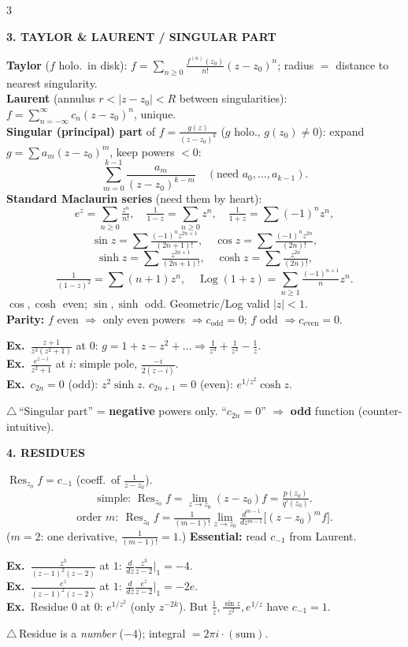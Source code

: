 \documentclass[a4paper,8pt]{extarticle}
\newcommand{\topic}[2]{%
  \vspace{4.5pt}%
  {\colorbox{#1}{\parbox{\dimexpr\columnwidth-2\fboxsep}{\color{white}\bfseries\footnotesize #2}}}\par\vspace{2.5pt}}
\newcommand{\warn}{\textcolor{cWarn}{\textbf{\textwarning\,}}}
\newcommand{\textwarning}{$\triangle$}
\newcommand{\exo}{\textbf{\textcolor{cA}{Ex.}}\ }
\newcommand{\Res}{\operatorname{Res}}
\begin{document}
\begin{multicols}{3}
\topic{cA}{3. TAYLOR \& LAURENT / SINGULAR PART}
\textbf{Taylor} ($f$ holo.\ in disk): $f=\sum_{n\ge0}\frac{f^{(n)}(z_0)}{n!}(z{-}z_0)^n$; radius $=$ distance to nearest singularity.\\
\textbf{Laurent} (annulus $r{<}|z{-}z_0|{<}R$ between singularities): $f=\sum_{n=-\infty}^{\infty}c_n(z{-}z_0)^n$, unique.\\
\textbf{Singular (principal) part} of $f=\frac{g(z)}{(z-z_0)^k}$ ($g$ holo., $g(z_0)\ne0$): expand $g=\sum a_m(z{-}z_0)^m$, keep powers $<0$:
\[ \sum_{m=0}^{k-1}\frac{a_m}{(z-z_0)^{k-m}}\quad(\text{need }a_0,\dots,a_{k-1}).\]
\textbf{Standard Maclaurin series} (need them by heart):
\[ e^z{=}\!\sum_{n\ge0}\tfrac{z^n}{n!},\quad \tfrac1{1-z}{=}\!\sum_{n\ge0}z^n,\quad \tfrac1{1+z}{=}\!\sum(-1)^nz^n,\]
\[ \sin z{=}\!\sum\tfrac{(-1)^nz^{2n+1}}{(2n+1)!},\quad \cos z{=}\!\sum\tfrac{(-1)^nz^{2n}}{(2n)!},\]
\[ \sinh z{=}\!\sum\tfrac{z^{2n+1}}{(2n+1)!},\quad \cosh z{=}\!\sum\tfrac{z^{2n}}{(2n)!},\]
\[ \tfrac1{(1-z)^2}{=}\!\sum(n{+}1)z^n,\quad \operatorname{Log}(1{+}z){=}\!\sum_{n\ge1}\tfrac{(-1)^{n+1}}{n}z^n.\]
$\cos,\cosh$ even; $\sin,\sinh$ odd. Geometric/Log valid $|z|{<}1$.\\
\textbf{Parity:} $f$ even $\Rightarrow$ only even powers $\Rightarrow c_{\text{odd}}{=}0$; $f$ odd $\Rightarrow c_{\text{even}}{=}0$.
\begin{ex}
\exo $\frac{z+1}{z^3(z^2+1)}$ at $0$: $g{=}1{+}z{-}z^2{+}\dots\Rightarrow\frac1{z^3}{+}\frac1{z^2}{-}\frac1z$.\\
\exo $\frac{e^{z-i}}{z^2+1}$ at $i$: simple pole, $\frac{-i}{2(z-i)}$.\\
\exo $c_{2n}{=}0$ (odd): $z^2\sinh z$. \;$c_{2n+1}{=}0$ (even): $e^{1/z^2}\cosh z$.
\end{ex}
\begin{tip}\warn ``Singular part'' = \textbf{negative} powers only. ``$c_{2n}{=}0$'' $\Rightarrow$ \textbf{odd} function (counter-intuitive).\end{tip}

\topic{cA}{4. RESIDUES}
$\Res_{z_0}f=c_{-1}$ (coeff.\ of $\frac1{z-z_0}$).
\[ \text{simple: }\Res_{z_0}f=\lim_{z\to z_0}(z{-}z_0)f=\tfrac{p(z_0)}{q'(z_0)}.\]
\[ \text{order }m:\ \Res_{z_0}f=\tfrac{1}{(m-1)!}\lim_{z\to z_0}\tfrac{d^{m-1}}{dz^{m-1}}\big[(z{-}z_0)^mf\big].\]
($m{=}2$: one derivative, $\frac1{(m-1)!}{=}1$.) \textbf{Essential:} read $c_{-1}$ from Laurent.
\begin{ex}
\exo $\frac{z^3}{(z-1)^2(z-2)}$ at $1$: $\frac{d}{dz}\frac{z^3}{z-2}\big|_1=-4$.\\
\exo $\frac{e^z}{(z-1)^2(z-2)}$ at $1$: $\frac{d}{dz}\frac{e^z}{z-2}\big|_1=-2e$.\\
\exo Residue $0$ at $0$: $e^{1/z^2}$ (only $z^{-2k}$). But $\frac1z,\frac{\sin z}{z^2},e^{1/z}$ have $c_{-1}{=}1$.
\end{ex}
\begin{tip}\warn Residue is a \emph{number} ($-4$); integral $=2\pi i\cdot(\text{sum})$.\end{tip}


\end{multicols}
\end{document}
